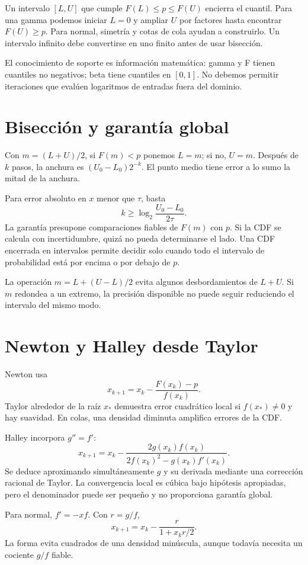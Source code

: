\documentclass[11pt,a4paper]{article}
\theoremstyle{definition}
\begin{document}
Un intervalo $[L,U]$ que cumple $F(L)\le p\le F(U)$ encierra el cuantil. Para una gamma podemos iniciar $L=0$ y ampliar $U$ por factores hasta encontrar $F(U)\ge p$. Para normal, simetría y cotas de cola ayudan a construirlo. Un intervalo infinito debe convertirse en uno finito antes de usar bisección.

El conocimiento de soporte es información matemática: gamma y F tienen cuantiles no negativos; beta tiene cuantiles en $[0,1]$. No debemos permitir iteraciones que evalúen logaritmos de entradas fuera del dominio.

\section{Bisección y garantía global}
Con $m=(L+U)/2$, si $F(m)<p$ ponemos $L=m$; si no, $U=m$. Después de $k$ pasos, la anchura es $(U_0-L_0)2^{-k}$. El punto medio tiene error a lo sumo la mitad de la anchura.

Para error absoluto en $x$ menor que $\tau$, basta
\[
k\ge\log_2\frac{U_0-L_0}{2\tau}.
\]
La garantía presupone comparaciones fiables de $F(m)$ con $p$. Si la CDF se calcula con incertidumbre, quizá no pueda determinarse el lado. Una CDF encerrada en intervalos permite decidir solo cuando todo el intervalo de probabilidad está por encima o por debajo de $p$.

La operación $m=L+(U-L)/2$ evita algunos desbordamientos de $L+U$. Si $m$ redondea a un extremo, la precisión disponible no puede seguir reduciendo el intervalo del mismo modo.

\section{Newton y Halley desde Taylor}
Newton usa
\[
x_{k+1}=x_k-\frac{F(x_k)-p}{f(x_k)}.
\]
Taylor alrededor de la raíz $x_*$ demuestra error cuadrático local si $f(x_*)\ne0$ y hay suavidad. En colas, una densidad diminuta amplifica errores de la CDF.

Halley incorpora $g''=f'$:
\[
x_{k+1}=x_k-\frac{2g(x_k)f(x_k)}
{2f(x_k)^2-g(x_k)f'(x_k)}.
\]
Se deduce aproximando simultáneamente $g$ y su derivada mediante una corrección racional de Taylor. La convergencia local es cúbica bajo hipótesis apropiadas, pero el denominador puede ser pequeño y no proporciona garantía global.

Para normal, $f'=-xf$. Con $r=g/f$,
\[
x_{k+1}=x_k-\frac{r}{1+x_kr/2}.
\]
La forma evita cuadrados de una densidad minúscula, aunque todavía necesita un cociente $g/f$ fiable.
\end{document}

